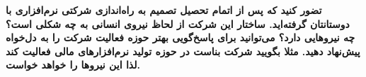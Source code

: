 
\textbf{تضور کنید که پس از اتمام تحصیل تصمیم به راه‌اندازی شرکتی نرم‌افزاری با دوستانتان گرفته‌اید. ساختار این شرکت از لحاظ نیروی انسانی به چه شکلی است؟ چه نیروهایی دارد؟ می‌توانید برای پاسخ‌گویی بهتر حوزه فعالیت شرکت را به دل‌خواه پیش‌نهاد دهید. مثلا بگویید شرکت بناست در حوزه تولید نرم‌افزارهای مالی فعالیت کند لذا این نیروها را خواهد خواست. }
\newline
